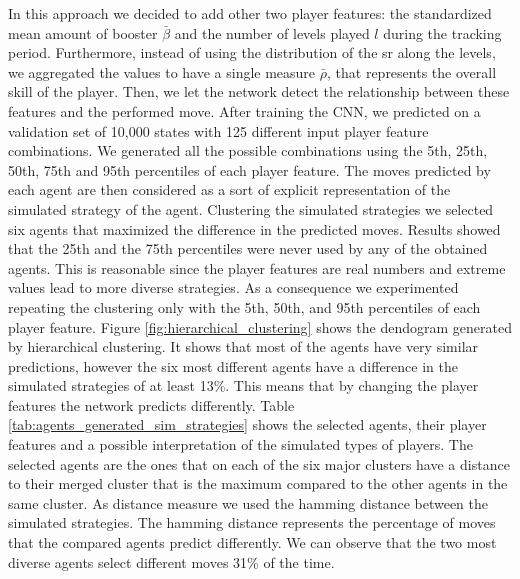 In this approach we decided to add other two player features: the standardized mean amount of booster $\bar{\beta}$ and the number of levels played $l$ during the tracking period. Furthermore, instead of using the distribution of the \acs{sr} along the levels, we aggregated the values to have a single measure $\bar{\rho}$, that represents the overall skill of the player. Then, we let the network detect the relationship between these features and the performed move. After training the \acs{CNN}, we predicted on a validation set of 10,000 states with 125 different input player feature combinations. We generated all the possible combinations using the 5th, 25th, 50th, 75th and 95th percentiles of each player feature. The moves predicted by each agent are then considered as a sort of explicit representation of the simulated strategy of the agent. Clustering the simulated strategies we selected six agents that maximized the difference in the predicted moves. Results showed that the 25th and the 75th percentiles were never used by any of the obtained agents. This is reasonable since the player features are real numbers and extreme values lead to more diverse strategies. As a consequence we experimented repeating the clustering only with the 5th, 50th, and 95th percentiles of each player feature. Figure \ref{fig:hierarchical_clustering} shows the dendogram generated by hierarchical clustering. It shows that most of the agents have very similar predictions, however the six most different agents have a difference in the simulated strategies of at least 13\%. This means that by changing the player features the network predicts differently. Table \ref{tab:agents_generated_sim_strategies} shows the selected agents, their player features and a possible interpretation of the simulated types of players. The selected agents are the ones that on each of the six major clusters have a distance to their merged cluster that is the maximum compared to the other agents in the same cluster. As distance measure we used the hamming distance between the simulated strategies. The hamming distance represents the percentage of moves that the compared agents predict differently. We can observe that the two most diverse agents select different moves 31\% of the time.
